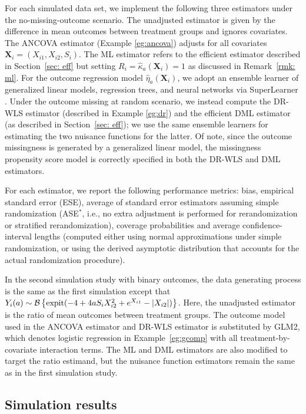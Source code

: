\documentclass[12pt]{article}
\newcommand{\bX}{\boldsymbol{X}}\newcommand{\bO}{\boldsymbol{O}}
\begin{document}
{For each simulated data set, we implement the following three estimators under the no-missing-outcome scenario. The unadjusted estimator is given by the difference in mean outcomes between treatment groups and ignores covariates. The ANCOVA estimator (Example \ref{eg:ancova}) adjusts for all covariates $\bX_i=(X_{i1},X_{i2},S_i)$. The ML estimator refers to the efficient estimator described in Section~\ref{sec: eff} but setting $R_i = \widehat{\kappa}_a(\bX_i)=1$ as discussed in Remark~\ref{rmk: ml}. For the outcome regression model $\widehat{\eta}_a(\bX_i)$, we adopt an ensemble learner of generalized linear models, regression trees, and neural networks via SuperLearner \citep{van2007super}. Under the outcome missing at random scenario, we instead compute the DR-WLS estimator (described in Example \ref{eg:dr}) and the efficient DML estimator (as described in Section~\ref{sec: eff}); we use the same ensemble learners for estimating the two nuisance functions for the latter. Of note, since the outcome missingness is generated by a generalized linear model, the missingness propensity score model is correctly specified in both the DR-WLS and DML estimators.

For each estimator, we report the following performance metrics: bias, empirical standard error (ESE), average of standard error estimators assuming simple randomization (ASE$^*$, i.e., no extra adjustment is performed for rerandomization or stratified rerandomization), coverage probabilities and average confidence-interval lengths (computed either using normal approximations under simple randomization, or using the derived asymptotic distribution that accounts for the actual randomization procedure). 

In the second simulation study with binary outcomes, the data generating process is the same as the first simulation except that $Y_i(a) \sim \mathcal{B}\left\{\textup{expit}(-4+4aS_iX_{i2}^2 + e^{X_{i1}}-|X_{i2}|)\right\}$. Here, the unadjusted estimator is the ratio of mean outcomes between treatment groups. The outcome model used in the ANCOVA estimator and DR-WLS estimator is substituted by GLM2, which denotes logistic regression in Example~\ref{eg:gcomp} with all treatment-by-covariate interaction terms. The ML and DML estimators are also modified to target the ratio estimand, but the nuisance function estimators remain the same as in the first simulation study. %

\subsection{Simulation results}

}
\end{document}
